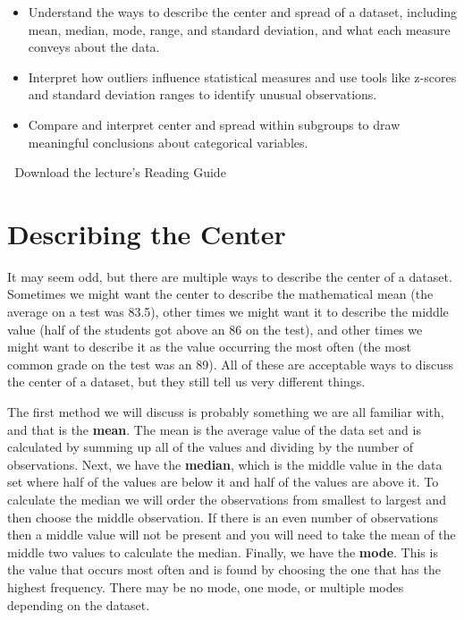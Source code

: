 \documentclass[
  letterpaper,
  DIV=11,
  numbers=noendperiod]{scrreprt}
\providecommand{\tightlist}{%
  \setlength{\itemsep}{0pt}\setlength{\parskip}{0pt}}
\begin{document}
\begin{itemize}
\tightlist
\item
  Understand the ways to describe the center and spread of a dataset,
  including mean, median, mode, range, and standard deviation, and what
  each measure conveys about the data.
\item
  Interpret how outliers influence statistical measures and use tools
  like z-scores and standard deviation ranges to identify unusual
  observations.
\item
  Compare and interpret center and spread within subgroups to draw
  meaningful conclusions about categorical variables.
\end{itemize}

\begin{tcolorbox}[enhanced jigsaw, leftrule=.75mm, arc=.35mm, coltitle=black, rightrule=.15mm, bottomrule=.15mm, toprule=.15mm, left=2mm, colbacktitle=quarto-callout-tip-color!10!white, title=\textcolor{quarto-callout-tip-color}{\faLightbulb}\hspace{0.5em}{Supplemental Material}, toptitle=1mm, breakable, colframe=quarto-callout-tip-color-frame, bottomtitle=1mm, titlerule=0mm, colback=white, opacityback=0, opacitybacktitle=0.6]

📄 Download the lecture's Reading Guide

\end{tcolorbox}

\section{Describing the Center}\label{describing-the-center}

It may seem odd, but there are multiple ways to describe the center of a
dataset. Sometimes we might want the center to describe the mathematical
mean (the average on a test was 83.5), other times we might want it to
describe the middle value (half of the students got above an 86 on the
test), and other times we might want to describe it as the value
occurring the most often (the most common grade on the test was an 89).
All of these are acceptable ways to discuss the center of a dataset, but
they still tell us very different things.

The first method we will discuss is probably something we are all
familiar with, and that is the \textbf{mean}. The mean is the average
value of the data set and is calculated by summing up all of the values
and dividing by the number of observations. Next, we have the
\textbf{median}, which is the middle value in the data set where half of
the values are below it and half of the values are above it. To
calculate the median we will order the observations from smallest to
largest and then choose the middle observation. If there is an even
number of observations then a middle value will not be present and you
will need to take the mean of the middle two values to calculate the
median. Finally, we have the \textbf{mode}. This is the value that
occurs most often and is found by choosing the one that has the highest
frequency. There may be no mode, one mode, or multiple modes depending
on the dataset.
\end{document}
